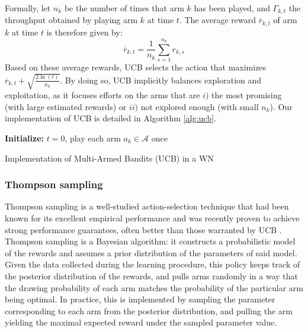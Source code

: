 \documentclass{article}
\begin{document}
	Formally, let $n_k$ be the number of times that arm $k$ has been played, and $\Gamma_{k,t}$ the throughput obtained by playing arm $k$ at time $t$. The average reward $\overline{r}_{k,t}$ \textcolor{black}{of} arm $k$ at time $t$ is therefore given by:
	\begin{equation}
	\label{eq:ucb}
	\overline{r}_{k,t} = \frac{1}{n_k} \sum_{s=1}^{n_k} r_{k,s}
	\nonumber
	\end{equation}	
	Based on these average rewards, UCB selects the action that maximizes $\overline{r}_{k,t} + \sqrt{\frac{2 \ln(t)}{n_k}}$. By doing so, UCB implicitly balances exploration and exploitation, as it focuses efforts on the arms that are $i)$ the most promising (with large estimated rewards) or $ii)$ not explored enough (with small $n_k$). Our implementation of UCB is detailed in Algorithm \ref{alg:ucb}.	
	
	\begin{algorithm}[]
		\SetAlgoLined
		\textbf{Initialize:} $t=0$, play each arm $a_k \in \mathcal{A}$ once\\
		\caption{Implementation of Multi-Armed Bandits (UCB) in a WN}
		\label{alg:ucb}			
	\end{algorithm}	
	
	\subsubsection{Thompson sampling}
	\label{section:bandits_thompsons}	
	Thompson sampling \cite{thompson1933likelihood} is a well-studied action-selection technique that had been known for its excellent empirical performance \cite{CL11} and was recently proven to achieve strong performance guarantees, often better than those warranted by UCB \cite{AG12,KKM12,KKM13}. Thompson sampling is a Bayesian algorithm: it constructs a probabilistic model of the rewards and assumes a prior distribution of the parameters of said model. Given the data collected during the learning procedure, this policy keeps track of the posterior distribution of the rewards, and pulls arms randomly in a way that the drawing probability of each arm matches the probability of the particular arm being optimal. In practice, this is implemented by sampling the parameter corresponding to each arm from the posterior distribution, and pulling the arm yielding the maximal expected reward under the sampled parameter value.
	
\end{document}

